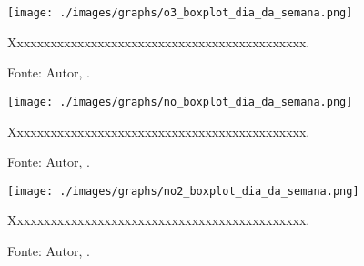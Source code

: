 
\lipsum[100]




\begin{figure}[H]
    \centering
    \texttt{[image: ./images/graphs/o3\_boxplot\_dia\_da\_semana.png]}
    \caption{Xxxxxxxxxxxxxxxxxxxxxxxxxxxxxxxxxxxxxxxxxxxx.}
    \label{fig:o3_boxplot_dia_da_semana.png}
    \caption*{Fonte: Autor, \imprimirdata.}
\end{figure}




\lipsum[100]




\begin{figure}[H]
    \centering
    \texttt{[image: ./images/graphs/no\_boxplot\_dia\_da\_semana.png]}
    \caption{Xxxxxxxxxxxxxxxxxxxxxxxxxxxxxxxxxxxxxxxxxxxx.}
    \label{fig:no_boxplot_dia_da_semana.png}
    \caption*{Fonte: Autor, \imprimirdata.}
\end{figure}




\lipsum[100]




\begin{figure}[H]
    \centering
    \texttt{[image: ./images/graphs/no2\_boxplot\_dia\_da\_semana.png]}
    \caption{Xxxxxxxxxxxxxxxxxxxxxxxxxxxxxxxxxxxxxxxxxxxx.}
    \label{fig:no2_boxplot_dia_da_semana.png}
    \caption*{Fonte: Autor, \imprimirdata.}
\end{figure}


